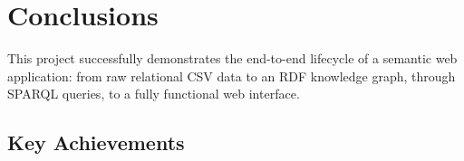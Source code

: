 \documentclass[12pt,a4paper]{article}
\begin{document}
\section{Conclusions}

This project successfully demonstrates the end-to-end lifecycle of a semantic
web application: from raw relational CSV data to an RDF knowledge graph, through
SPARQL queries, to a fully functional web interface.

\subsection{Key Achievements}
\end{document}
